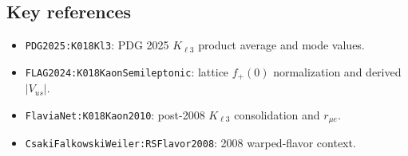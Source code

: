 \subsection*{Key references}
\begin{itemize}
\item \texttt{PDG2025:K018Kl3}: PDG 2025 \(K_{\ell3}\) product average and mode values.
\item \texttt{FLAG2024:K018KaonSemileptonic}: lattice \(f_+(0)\) normalization and derived \(|V_{us}|\).
\item \texttt{FlaviaNet:K018Kaon2010}: post-2008 \(K_{\ell3}\) consolidation and \(r_{\mu e}\).
\item \texttt{CsakiFalkowskiWeiler:RSFlavor2008}: 2008 warped-flavor context.
\end{itemize}
